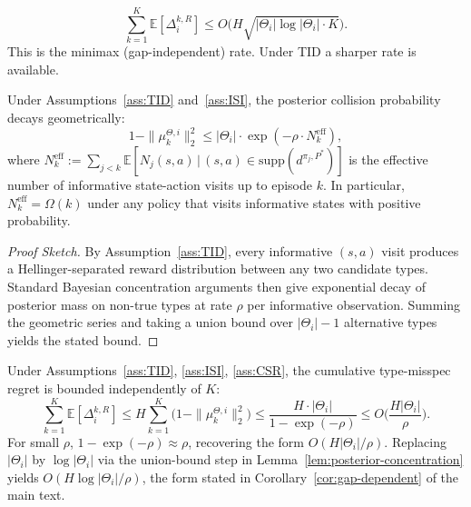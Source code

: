\begin{equation}
\sum_{k=1}^K \mathbb{E}[\Delta_i^{k,R}] \leq O\big(H \sqrt{|\Theta_i| \log|\Theta_i| \cdot K}\big).
\end{equation}
This is the minimax (gap-independent) rate. Under TID a sharper rate is available.

\begin{lemma}
\label{lem:posterior-concentration}
Under Assumptions~\ref{ass:TID} and~\ref{ass:ISI}, the posterior collision probability decays geometrically:
\begin{equation}
1 - \|\mu_k^{\Theta,i}\|_2^2 \leq |\Theta_i| \cdot \exp(-\rho \cdot N_k^{\mathrm{eff}}),
\end{equation}
where $N_k^{\mathrm{eff}} := \sum_{j < k} \mathbb{E}[N_j(s, a) \,\big|\, (s, a) \in \mathrm{supp}(d^{\pi_j, P^*})]$ is the effective number of informative state-action visits up to episode $k$. In particular, $N_k^{\mathrm{eff}} = \Omega(k)$ under any policy that visits informative states with positive probability.
\end{lemma}

\begin{proof}[Proof Sketch]
By Assumption~\ref{ass:TID}, every informative $(s, a)$ visit produces a Hellinger-separated reward distribution between any two candidate types. Standard Bayesian concentration arguments \citep[Theorem 4.2]{ghosal2007convergence} then give exponential decay of posterior mass on non-true types at rate $\rho$ per informative observation. Summing the geometric series and taking a union bound over $|\Theta_i| - 1$ alternative types yields the stated bound.
\end{proof}

\begin{corollary}
\label{cor:gap-dependent-appendix}
Under Assumptions~\ref{ass:TID}, \ref{ass:ISI}, \ref{ass:CSR}, the cumulative type-misspec regret is bounded independently of $K$:
\begin{equation}
\sum_{k=1}^K \mathbb{E}[\Delta_i^{k,R}] \leq H \sum_{k=1}^K \big(1 - \|\mu_k^{\Theta,i}\|_2^2\big) \leq \frac{H \cdot |\Theta_i|}{1 - \exp(-\rho)} \leq O\bigg(\frac{H |\Theta_i|}{\rho}\bigg).
\end{equation}
For small $\rho$, $1 - \exp(-\rho) \approx \rho$, recovering the form $O(H |\Theta_i|/\rho)$. Replacing $|\Theta_i|$ by $\log|\Theta_i|$ via the union-bound step in Lemma~\ref{lem:posterior-concentration} yields $O(H \log|\Theta_i|/\rho)$, the form stated in Corollary~\ref{cor:gap-dependent} of the main text.
\end{corollary}

